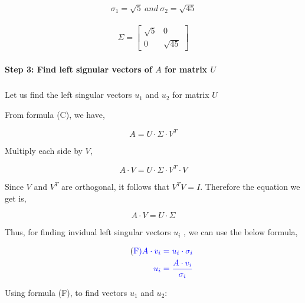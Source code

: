 \documentclass[a4paper]{report}
\begin{document}
\begin{align}
    \sigma_1=\sqrt{5}\ and\ \sigma_2=\sqrt{45} 
\end{align}

\begin{align}
   \boxed{\Sigma=\begin{bmatrix}
    \sqrt{5}&0\\0&\sqrt{45}
\end{bmatrix} }
\end{align}



\newpage
\paragraph{Step 3: Find left signular vectors of $A$ for matrix $U$}

\subparagraph{}

Let us find the left singular vectors $u_1$ and $u_2$ for matrix $U$

From formula (C), we have, 

$$A=U\cdot\Sigma \cdot V^T$$

Multiply each side by $V$,

$$ A\cdot V=U\cdot\Sigma \cdot V^T\cdot V$$

Since $V$ and $V^T$ are orthogonal, it follows that $V^TV=I$. Therefore the equation we get is,

$$A\cdot V=U\cdot \Sigma$$

Thus, for finding invidual left singular vectors $u_i$ , we can use the below formula,

\begin{align*} \tag{\color{blue}F} 
\begin{split}
    \color{blue} A\cdot v_i=u_i\cdot\sigma_i   
\end{split} \\
\begin{split}
    \color{blue}u_i=\frac{A\cdot v_i}{\sigma_i}
\end{split}
\end{align*}
    

Using formula (F), to find vectors $u_1$ and $u_2$:
\end{document}
